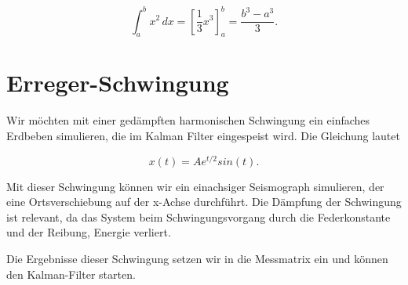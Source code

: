 \begin{equation}
\int_a^b x^2\, dx
=
\left[ \frac13 x^3 \right]_a^b
=
\frac{b^3-a^3}3.
\label{erdbeben:equation1}
\end{equation}

\section{Erreger-Schwingung}
Wir möchten mit einer gedämpften harmonischen Schwingung ein einfaches Erdbeben simulieren, die im Kalman Filter eingespeist wird.
Die Gleichung lautet

\begin{equation}
x(t)=Ae^{t/2}sin(t).
\end{equation}

Mit dieser Schwingung können wir ein einachsiger Seismograph simulieren, der eine Ortsverschiebung auf der x-Achse durchführt.
Die Dämpfung der Schwingung ist relevant, da das System beim Schwingungsvorgang durch die Federkonstante und der Reibung, Energie verliert.

Die Ergebnisse dieser Schwingung setzen wir in die Messmatrix ein und können den Kalman-Filter starten.





